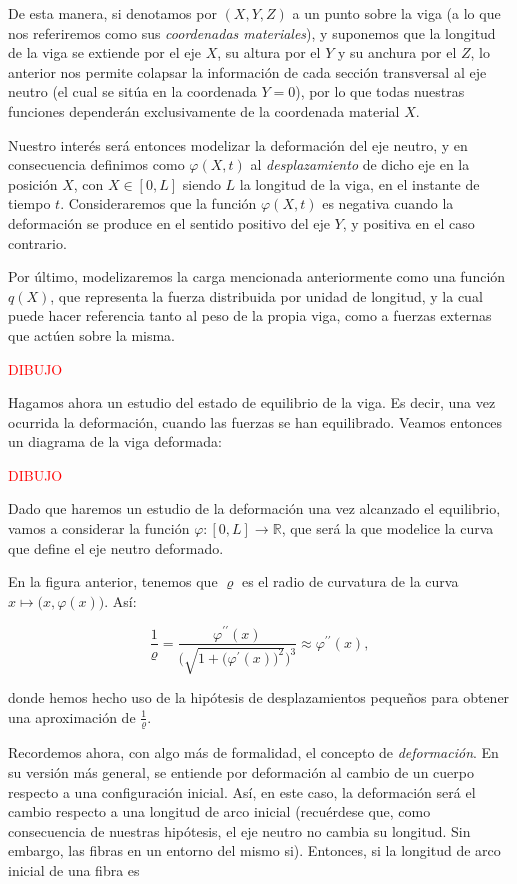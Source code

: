 De esta manera, si denotamos por $(X,Y,Z)$ a un punto sobre la viga (a lo que nos referiremos como sus \textit{coordenadas materiales}), y suponemos que la longitud de la viga se extiende por el eje $X$, su altura por el $Y$ y su anchura por el $Z$, lo anterior nos permite colapsar la información de cada sección transversal al eje neutro (el cual se sitúa en la coordenada $Y=0$), por lo que todas nuestras funciones dependerán exclusivamente de la coordenada material $X$. 

Nuestro interés será entonces modelizar la deformación del eje neutro, y en consecuencia definimos como $\varphi(X, t)$ al \textit{desplazamiento} de dicho eje en la posición $X$, con $X \in [0,L]$ siendo $L$ la longitud de la viga, en el instante de tiempo $t$. Consideraremos que la función $\varphi(X,t)$ es negativa cuando la deformación se produce en el sentido positivo del eje $Y$, y positiva en el caso contrario. 

Por último, modelizaremos la carga mencionada anteriormente como una función $q(X)$, que representa la fuerza distribuida por unidad de longitud, y la cual puede hacer referencia tanto al peso de la propia viga, como a fuerzas externas que actúen sobre la misma.

\textcolor{red}{DIBUJO}

Hagamos ahora un estudio del estado de equilibrio de la viga. Es decir, una vez ocurrida la deformación, cuando las fuerzas se han equilibrado. Veamos entonces un diagrama de la viga deformada:

\textcolor{red}{DIBUJO}

Dado que haremos un estudio de la deformación una vez alcanzado el equilibrio, vamos a considerar la función $\varphi: [0,L] \rightarrow \mathbb{R}$, que será la que modelice la curva que define el eje neutro deformado.

En la figura anterior, tenemos que $\varrho$ es el radio de curvatura de la curva $x \mapsto \Big(x, \varphi(x)\Big)$. Así:

\[\frac{1}{\varrho} = \frac{\varphi^{\prime \prime}(x)}{\Big(\sqrt{1 + \big(\varphi^{\prime}(x) \big)^2} \Big)^3} \approx \varphi^{\prime \prime}(x),\]

donde hemos hecho uso de la hipótesis de desplazamientos pequeños para obtener una aproximación de $\frac{1}{\varrho}$.

Recordemos ahora, con algo más de formalidad, el concepto de \textit{deformación}. En su versión más general, se entiende por deformación al cambio de un cuerpo respecto a una configuración inicial. Así, en este caso, la deformación será el cambio respecto a una longitud de arco inicial (recuérdese que, como consecuencia de nuestras hipótesis, el eje neutro no cambia su longitud. Sin embargo, las fibras en un entorno del mismo si). Entonces, si la longitud de arco inicial de una fibra es


